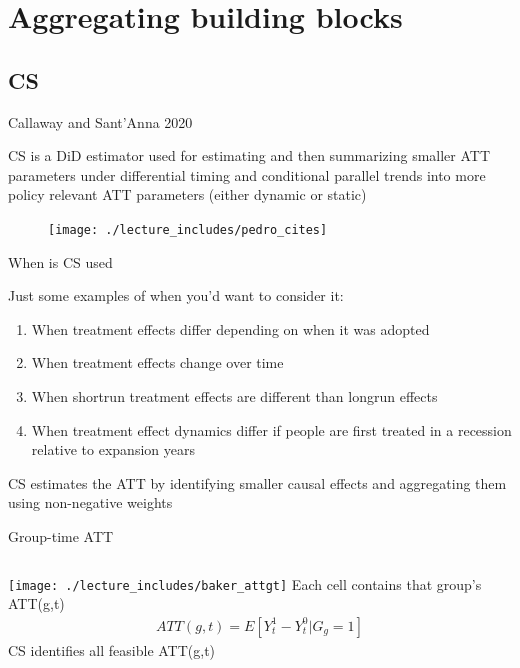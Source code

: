 \documentclass{beamer}
\begin{document}
\section{Aggregating building blocks}

\subsection{CS}



\begin{frame}{Callaway and Sant'Anna 2020}

CS is a DiD estimator used for estimating and then summarizing smaller ATT parameters under differential timing and conditional parallel trends into more policy relevant ATT parameters (either dynamic or static)


\begin{figure}
\texttt{[image: ./lecture\_includes/pedro\_cites]}
\end{figure}

\end{frame}


\begin{frame}{When is CS used}

Just some examples of when you'd want to consider it:
\begin{enumerate}
\item When treatment effects differ depending on when it was adopted
\item When treatment effects change over time
\item When shortrun treatment effects are different than longrun effects
\item When treatment effect dynamics differ if people are first treated in a recession relative to expansion years
\end{enumerate}

\bigskip

CS estimates the ATT by identifying smaller causal effects and aggregating them using non-negative weights

\end{frame}






\begin{frame}{Group-time ATT}
       \begin{columns}
             \centering
             \texttt{[image: ./lecture\_includes/baker\_attgt]}
            Each cell contains that group's ATT(g,t)
\begin{eqnarray*}
ATT(g,t) = E[Y_t^1 - Y_t^0 | G_g=1]
\end{eqnarray*}CS identifies all feasible ATT(g,t)
         \end{columns} 
    \end{frame}
\end{document}
